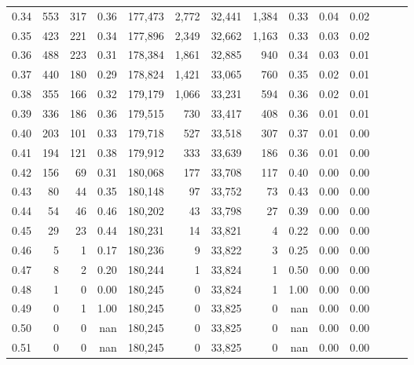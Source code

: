 \begin{tabular}{rrrrrrrrrrrrrr}
0.34 &     553 &    317 &  0.36 &  177,473 &    2,772 &  32,441 &   1,384 &  0.33 &  0.04 &      0.02 \\
0.35 &     423 &    221 &  0.34 &  177,896 &    2,349 &  32,662 &   1,163 &  0.33 &  0.03 &      0.02 \\
0.36 &     488 &    223 &  0.31 &  178,384 &    1,861 &  32,885 &     940 &  0.34 &  0.03 &      0.01 \\
0.37 &     440 &    180 &  0.29 &  178,824 &    1,421 &  33,065 &     760 &  0.35 &  0.02 &      0.01 \\
0.38 &     355 &    166 &  0.32 &  179,179 &    1,066 &  33,231 &     594 &  0.36 &  0.02 &      0.01 \\
0.39 &     336 &    186 &  0.36 &  179,515 &      730 &  33,417 &     408 &  0.36 &  0.01 &      0.01 \\
0.40 &     203 &    101 &  0.33 &  179,718 &      527 &  33,518 &     307 &  0.37 &  0.01 &      0.00 \\
0.41 &     194 &    121 &  0.38 &  179,912 &      333 &  33,639 &     186 &  0.36 &  0.01 &      0.00 \\
0.42 &     156 &     69 &  0.31 &  180,068 &      177 &  33,708 &     117 &  0.40 &  0.00 &      0.00 \\
0.43 &      80 &     44 &  0.35 &  180,148 &       97 &  33,752 &      73 &  0.43 &  0.00 &      0.00 \\
0.44 &      54 &     46 &  0.46 &  180,202 &       43 &  33,798 &      27 &  0.39 &  0.00 &      0.00 \\
0.45 &      29 &     23 &  0.44 &  180,231 &       14 &  33,821 &       4 &  0.22 &  0.00 &      0.00 \\
0.46 &       5 &      1 &  0.17 &  180,236 &        9 &  33,822 &       3 &  0.25 &  0.00 &      0.00 \\
0.47 &       8 &      2 &  0.20 &  180,244 &        1 &  33,824 &       1 &  0.50 &  0.00 &      0.00 \\
0.48 &       1 &      0 &  0.00 &  180,245 &        0 &  33,824 &       1 &  1.00 &  0.00 &      0.00 \\
0.49 &       0 &      1 &  1.00 &  180,245 &        0 &  33,825 &       0 &   nan &  0.00 &      0.00 \\
0.50 &       0 &      0 &   nan &  180,245 &        0 &  33,825 &       0 &   nan &  0.00 &      0.00 \\
0.51 &       0 &      0 &   nan &  180,245 &        0 &  33,825 &       0 &   nan &  0.00 &      0.00 \\

\end{tabular}
